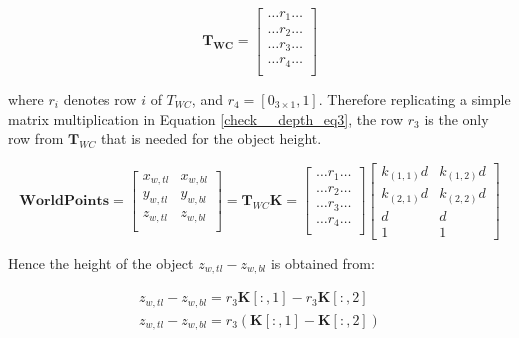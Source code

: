 \documentclass[a4paper,11pt,notitlepage]{article}
\begin{document}
\begin{equation}
\mathbf{T_{WC}} = 
\begin{bmatrix}
\dots r_{1} \dots \\
\dots r_{2} \dots \\
\dots r_{3} \dots \\
\dots r_{4} \dots \\
\end{bmatrix}
\label{check__depth_eq2}
\end{equation}
 
where $r_{i}$ denotes row $i$ of $T_{WC}$, and $r_{4} =[0_{3 \times 1},1]$. Therefore replicating a simple matrix multiplication in Equation \ref{check__depth_eq3}, the row $r_{3}$ is the only row from $\mathbf{T}_{WC}$ that is needed for the object height.

\begin{equation}
\mathbf{WorldPoints} = 
\begin{bmatrix}
x_{w,tl} &  x_{w,bl}\\
y_{w,tl} & y_{w,bl}\\
z_{w,tl} & z_{w,bl} \\
\end{bmatrix} = 
\mathbf{T}_{WC}\mathbf{K} =
\begin{bmatrix}
\dots r_{1} \dots \\
\dots r_{2} \dots \\
\dots r_{3} \dots \\
\dots r_{4} \dots \\
\end{bmatrix}
\begin{bmatrix}
k_{(1,1)}\mathit{d} & k_{(1,2)}\mathit{d}\\
k_{(2,1)}\mathit{d} & k_{(2,2)}\mathit{d}\\
\mathit{d} & \mathit{d}\\
1 & 1
\end{bmatrix} 
\label{check__depth_eq3}
\end{equation}

Hence the height of the object $z_{w,tl}-z_{w,bl}$ is obtained from:

\begin{equation}
\begin{aligned}
z_{w,tl}-z_{w,bl} = r_{3} \mathbf{K}[:,1] - r_{3} \mathbf{K}[:,2]\\
z_{w,tl}-z_{w,bl} = r_{3} (\mathbf{K}[:,1]- \mathbf{K}[:,2])
\end{aligned}
\end{equation}
\end{document}
